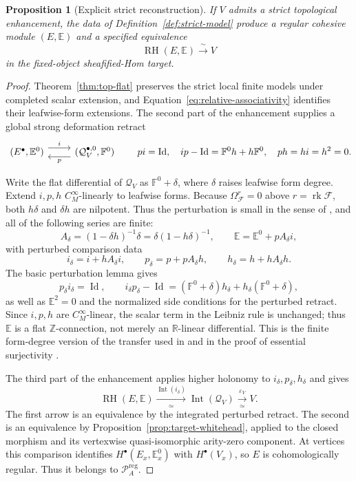 \documentclass[12pt]{amsart}
\newtheorem{prop}[thm]{Proposition}
\theoremstyle{definition}
\theoremstyle{remark}
\numberwithin{equation}{section}
\newcommand{\CF}{{\mathcal F}}
\newcommand{\A}{{A}}
\newcommand{\Z}{{\mathbb{Z}}}
\newcommand{\R}{{\mathbb{R}}}
\newcommand{\1}{{\mathbb{1}}}
\newcommand{\RH}{\operatorname{RH}}
\newcommand{\id}{\operatorname{Id}}
\newcommand{\rk}{\operatorname{rk}}
\begin{document}
\begin{prop}[Explicit strict reconstruction]
\label{prop:strict-reconstruction}
If $V$ admits a strict topological enhancement, the data of
Definition~\ref{def:strict-model} produce a regular cohesive module
$(E,\mathbb E)$ and a specified equivalence
\[
 \RH(E,\mathbb E)\xrightarrow{\;\sim\;}V
\]
in the fixed-object sheafified-Hom target.
\end{prop}

\begin{proof}
Theorem~\ref{thm:top-flat} preserves the strict
local finite models under completed scalar extension, and
Equation~\eqref{eq:relative-associativity} identifies their
leafwise-form extensions.  The second part of the enhancement supplies
a global strong deformation retract
\[
 \begin{tikzcd}
 (E^\bullet,\mathbb E^0)
 \arrow[r,shift left=1.1ex,"i"]
 &
 (\mathcal Q_V^{\bullet,0},\mathbb F^0)
 \arrow[l,shift left=1.1ex,"p"]
 \end{tikzcd}
 \qquad
 pi=\id,\quad
 ip-\id=\mathbb F^0h+h\mathbb F^0,\quad
 ph=hi=h^2=0.
\]

Write the flat differential of $\mathcal Q_V$ as
$\mathbb F^0+\delta$, where $\delta$ raises leafwise form degree.
Extend $i,p,h$ $C^\infty_M$-linearly to leafwise forms.  Because
$\Omega^r_{\CF}=0$ above $r=\rk\CF$, both $h\delta$ and $\delta h$ are
nilpotent.  Thus the perturbation is small in the sense of
\cite[Section 2]{Cra04}, and all of the following series are finite:
\[
 A_\delta
 =
 (1-\delta h)^{-1}\delta
 =
 \delta(1-h\delta)^{-1},
 \qquad
 \mathbb E
 =
 \mathbb E^0+pA_\delta i,
\]
with perturbed comparison data
\[
 i_\delta=i+hA_\delta i,\qquad
 p_\delta=p+pA_\delta h,\qquad
 h_\delta=h+hA_\delta h.
\]
The basic perturbation lemma gives
\[
 p_\delta i_\delta=\id,\qquad
 i_\delta p_\delta-\id
 =
 (\mathbb F^0+\delta)h_\delta
 +h_\delta(\mathbb F^0+\delta),
\]
as well as $\mathbb E^2=0$ and the normalized side conditions for the
perturbed retract.  Since $i,p,h$ are $C^\infty_M$-linear, the scalar
term in the Leibniz rule is unchanged; thus $\mathbb E$ is a flat
$\Z$-connection, not merely an $\R$-linear differential.  This is the
finite form-degree version of the transfer used in
\cite[Theorem 3.13]{Blo05} and in the proof of essential
surjectivity \cite[Theorem 4.5]{BS14}.

The third part of the enhancement applies higher holonomy to
$i_\delta,p_\delta,h_\delta$ and gives
\[
 \RH(E,\mathbb E)
 \xrightarrow[\simeq]{\operatorname{Int}(i_\delta)}
 \operatorname{Int}(\mathcal Q_V)
 \xrightarrow[\simeq]{\varepsilon_V}V.
\]
The first arrow is an equivalence by the integrated perturbed retract.
The second is an equivalence by
Proposition~\ref{prop:target-whitehead}, applied to the closed
morphism and its vertexwise quasi-isomorphic arity-zero component.
At vertices this comparison identifies
$H^\bullet(E_x,\mathbb E_x^0)$ with $H^\bullet(V_x)$, so $E$ is
cohomologically regular.  Thus it belongs to
$\mathcal P_{\A}^{\mathrm{reg}}$.
\end{proof}
\end{document}
